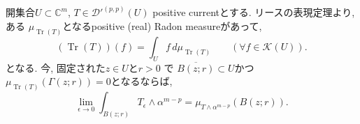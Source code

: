 \begin{tcolorbox}[mybox]
\begin{lem}
\label{lem-H-5.16}
開集合$U\subset\mathbb{C}^m$, $T\in\mathcal{D}'^{(p,p)}(U)$ positive  currentとする. 
リースの表現定理より, ある
$\mu_{\operatorname{Tr}(T)}$となるpositive (real) Radon measureがあって, 
\begin{equation*}
(\operatorname{Tr}(T))(f)
=
\int_U f\,d\mu_{\operatorname{Tr}(T)}
\qquad
(\forall f\in\mathcal{K}(U)).
\end{equation*}
となる. 今, 固定された$z\in U$と$r>0$ で
$\overline{B(z;r)}\subset U$かつ$\mu_{\operatorname{Tr}(T)}(\Gamma(z;r))=0$となるならば, 
\begin{equation*}
\lim_{\epsilon\to0}
\int_{B(z;r)}T_\epsilon\wedge\alpha^{m-p}
=
\mu_{T\wedge\alpha^{m-p}}(B(z;r)).
\end{equation*}
\end{lem}
\end{tcolorbox}
